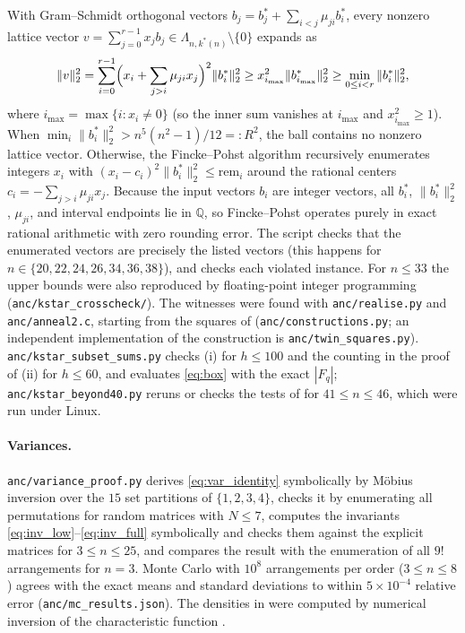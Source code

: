 With Gram--Schmidt orthogonal vectors $b_j = b_j^* + \sum_{i<j} \mu_{ji} b_i^*$, every nonzero lattice vector $v = \sum_{j=0}^{r-1} x_j b_j \in \Lambda_{n,k^*(n)} \setminus \{0\}$ expands as
\[
\|v\|_2^2 = \sum_{i=0}^{r-1} \Bigl(x_i + \sum_{j>i} \mu_{ji} x_j\Bigr)^2 \|b_i^*\|_2^2 \ge x_{i_{\max}}^2 \|b_{i_{\max}}^*\|_2^2 \ge \min_{0\le i < r} \|b_i^*\|_2^2 ,
\]
where $i_{\max} = \max\{i : x_i \ne 0\}$ (so the inner sum vanishes at $i_{\max}$ and $x_{i_{\max}}^2 \ge 1$).
When $\min_i \|b_i^*\|_2^2 > n^5(n^2-1)/12 =: R^2$, the ball contains no nonzero lattice vector.
Otherwise, the Fincke--Pohst algorithm recursively enumerates integers $x_i$ with $(x_i - c_i)^2 \|b_i^*\|_2^2 \le \mathrm{rem}_i$ around the rational centers $c_i = -\sum_{j>i} \mu_{ji} x_j$.
Because the input vectors $b_i$ are integer vectors, all $b_i^*$, $\|b_i^*\|_2^2$, $\mu_{ji}$, and interval endpoints lie in $\mathbb{Q}$, so Fincke--Pohst operates purely in exact rational arithmetic with zero rounding error.
The script checks that the enumerated vectors are precisely the listed vectors (this happens for $n\in\{20,22,24,26,34,36,38\}$), and checks each violated instance.
For $n\le33$ the upper bounds were also reproduced by floating-point integer programming (\texttt{anc/kstar\_crosscheck/}).
The witnesses were found with \texttt{anc/realise.py} and \texttt{anc/anneal2.c}, starting from the squares of  (\texttt{anc/constructions.py}; an independent implementation of the construction is \texttt{anc/twin\_squares.py}).
\texttt{anc/kstar\_subset\_sums.py} checks (i) for $h\le100$ and the counting in the proof of (ii) for $h\le60$, and evaluates \eqref{eq:box} with the exact $|F_q|$; \texttt{anc/kstar\_beyond40.py} reruns or checks the tests of  for $41\le n\le46$, which were run under Linux.

\paragraph{Variances.}
\texttt{anc/variance\_proof.py} derives \eqref{eq:var_identity} symbolically by M\"obius inversion over the $15$ set partitions of $\{1,2,3,4\}$, checks it by enumerating all permutations for random matrices with $N\le7$, computes the invariants \eqref{eq:inv_low}--\eqref{eq:inv_full} symbolically and checks them against the explicit matrices for $3\le n\le25$, and compares the result with the enumeration of all $9!$ arrangements for $n=3$.
Monte Carlo with $10^8$ arrangements per order ($3\le n\le8$) agrees with the exact means and standard deviations to within $5\times10^{-4}$ relative error (\texttt{anc/mc\_results.json}).
The densities in  were computed by numerical inversion of the characteristic function \cite{imhof1961}.

